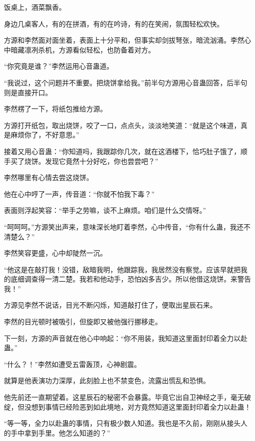 
\begin{this_body}



饭桌上，酒菜飘香。

身边几桌客人，有的在拼酒，有的在吟诗，有的在笑闹，氛围轻松欢快。

方源和李然面对面坐着，表面上十分平和，但事实却剑拔弩张，暗流汹涌。李然心中暗藏凛冽杀机，方源看似轻松，也防备着对方。

“你究竟是谁？”李然运用心音蛊道。

“我说过，这个问题并不重要。把烧饼拿给我。”前半句方源用心音蛊回答，后半句则是直接开口。

李然楞了一下，将纸包推给方源。

方源打开纸包，取出烧饼，咬了一口，点点头，淡淡地笑道：“就是这个味道，真是麻烦你了，不好意思。”

接着又用心音蛊：“你知道吗，我跟踪你几次，就在这酒楼下，恰巧肚子饿了，顺手买了烧饼。发现它竟然十分好吃，你也尝尝吧？”

李然哪里有心情去尝这烧饼。

他在心中哼了一声，传音道：“你就不怕我下毒？”

表面则浮起笑容：“举手之劳嘛，谈不上麻烦。咱们是什么交情呀。”

“呵呵呵。”方源笑出声来，意味深长地盯着李然，心中传音，“你有什么蛊，我还不清楚么？”

李然笑容更盛，心中却陡然一沉。

“他这是在敲打我！没错，敌暗我明，他跟踪我，我居然没有察觉。应该早就把我的底细调查得一清二楚。我若和他动手，恐怕凶多吉少。所以他借这烧饼。来警告我！”

方源见李然不说话，目光不断闪烁，知道敲打住了，便取出星辰石来。

李然的目光顿时被吸引，但旋即又被他强行挪移走。

下一刻，方源的声音就在他心中响起：“你不用装，我知道这里面封印着全力以赴蛊。”

“什么？！”李然如遭受五雷轰顶，心神剧震。

就算是他表演功力深厚，此刻脸上也不禁变色，流露出慌乱和恐惧。

他先前还一直期望着。这星辰石的秘密不会暴露。毕竟它出自卫神经之手，毫无破绽，但没想到事情已经险恶到如此境地，对方竟然知道这里面封印着全力以赴蛊！

“等一等，全力以赴蛊的事情，只有极少数人知道。我也是不久前，刚刚从接头人的手中拿到手里。他怎么知道的？”


\end{this_body}
